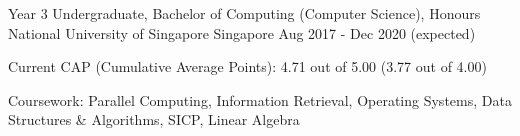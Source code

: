 

\begin{cventries}

  \cventry
  {Year 3 Undergraduate, Bachelor of Computing (Computer Science), Honours} %
  {National University of Singapore} %
  {Singapore} %
  {Aug 2017 - Dec 2020 (expected)} %
  {
    \begin{cvitems} %
      \item {Current CAP (Cumulative Average Points): 4.71 out of 5.00 (3.77 out of 4.00)}
      \item {Coursework: Parallel Computing, Information Retrieval, Operating Systems, Data Structures \& Algorithms, SICP, Linear Algebra}
    \end{cvitems}
  }




\end{cventries}
